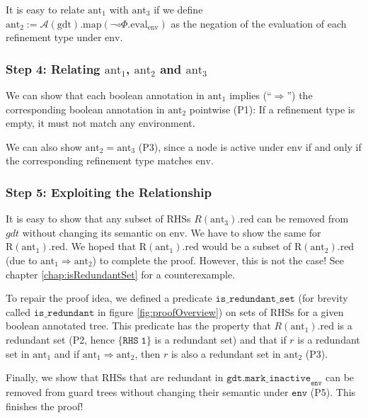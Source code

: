 It is easy to relate $\mathrm{ant_1}$ with $\mathrm{ant_3}$ if we define $\mathrm{ant_2} := \mathcal{A}(\mathrm{gdt}).\mathrm{map}(\neg \circ \Phi.\mathrm{eval}_{\mathrm{env}})$ as the negation of the evaluation of each refinement type under $\mathrm{env}$.

\subsubsection{Step 4: Relating $\mathrm{ant}_1$, $\mathrm{ant}_2$ and $\mathrm{ant}_3$}

We can show that each boolean annotation in $\mathrm{ant_1}$ implies (``$\Rightarrow$'') the corresponding boolean annotation in $\mathrm{ant_2}$ pointwise (P1):
If a refinement type is empty, it must not match any environment.

We can also show $\mathrm{ant}_2 = \mathrm{ant}_3$ (P3), since a node is active under $\mathrm{env}$ if and only if the corresponding refinement type matches $\mathrm{env}$.

\subsubsection{Step 5: Exploiting the Relationship}

It is easy to show that any subset of RHSs $R(\mathrm{ant_3}).\mathrm{red}$ can be removed from $gdt$ without changing its semantic on $\mathrm{env}$.
We have to show the same for $\mathrm{R}(\mathrm{ant_1}).\mathrm{red}$.
We hoped that $\mathrm{R}(\mathrm{ant_1}).\mathrm{red}$ would be a subset of $\mathrm{R}(\mathrm{ant_2}).\mathrm{red}$ (due to $\mathrm{ant_1} \Rightarrow \mathrm{ant_2}$) to complete the proof. However, this is not the case! See chapter \ref{chap:isRedundantSet} for a counterexample.

To repair the proof idea, we defined a predicate $\mathtt{is\_redundant\_set}$ (for brevity called $\mathtt{is\_redundant}$ in figure \ref{fig:proofOverview}) on sets of RHSs for a given boolean annotated tree.
This predicate has the property that $R(\mathrm{ant_1}).\mathrm{red}$ is a redundant set (P2, hence $\{ \mathtt{RHS\;1} \}$ is a redundant set) and that if $r$ is a redundant set in $\mathrm{ant_1}$ and if $\mathrm{ant_1} \Rightarrow \mathrm{ant_2}$,
then $r$ is also a redundant set in $\mathrm{ant_2}$ (P3).

Finally, we show that RHSs that are redundant in $\mathtt{gdt.mark\_inactive}_\mathtt{env}$ can be removed from guard trees without changing their semantic under $\mathtt{env}$ (P5).
This finishes the proof!

